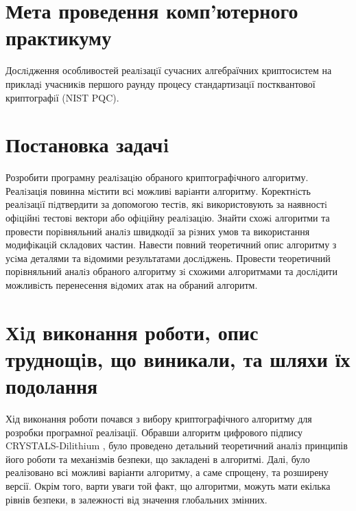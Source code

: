 \documentclass[12pt]{HomusWorkus}
\begin{document}

\addtocounter{page}{1}

\tableofcontents
\newpage


\section{Мета проведення комп’ютерного практикуму}

Дослiдження особливостей реалiзацiї сучасних алгебраїчних криптосистем на прикладi
учасникiв першого раунду процесу стандартизацiї постквантової криптографiї (NIST PQC).

\section{Постановка задачi}

Розробити програмну реалiзацiю обраного криптографiчного алгоритму. Реалiзацiя повинна мiстити всi можливi варiанти алгоритму. Коректнiсть реалiзацiї пiдтвердити за допомогою тестiв, якi використовують за наявностi офiцiйнi тестовi вектори або офiцiйну реалiзацiю. Знайти схожi алгоритми та провести порiвняльний аналiз швидкодiї за рiзних умов та використання модифiкацiй складових частин. Навести повний теоретичний опис алгоритму з усiма деталями та вiдомими результатами дослiджень. Провести теоретичний порiвняльний аналiз обраного алгоритму зi схожими алгоритмами та дослiдити можливiсть перенесення вiдомих атак на обраний алгоритм.

\section{Хiд виконання роботи, опис труднощiв, що виникали, та шляхи їх подолання}

Хід виконання роботи почався з вибору криптографічного алгоритму для розробки програмної реалізації. Обравши алгоритм цифрового підпису CRYSTALS-Dilithium \cite{Ducas2017}, було проведено детальний теоретичний аналіз принципів його роботи та механізмів безпеки, що закладені в алгоритмі. Далі, було реалізовано всі можливі варіанти алгоритму, а саме спрощену, та розширену версії. Окрім того, варти уваги той факт, що алгоритми, можуть мати екілька рівнів безпеки, в залежності від значення глобальних змінних.
\end{document}

